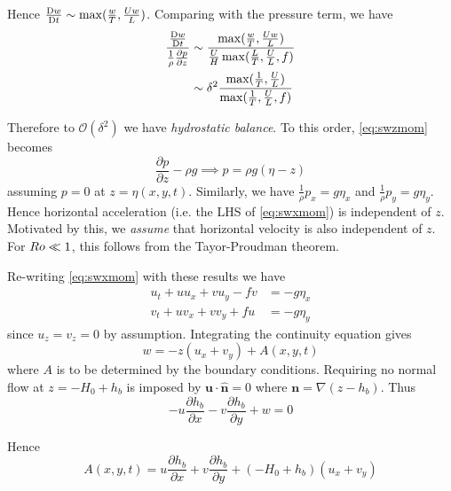 \documentclass{jknotes}
\begin{document}
Hence $\frac{\mathrm{D} w}{\mathrm{D} t} \sim \max(\frac{w}{T}, \frac{Uw}{L})$. Comparing with the
pressure term, we have
\begin{align}
	\frac{\frac{\mathrm{D} w}{\mathrm{D} t}}{\frac{1}{\rho}\frac{\partial p}{\partial
		z}} &\sim \frac{\max(\frac{w}{T},
		\frac{Uw}{L})}{\frac{U}{H}\max(\frac{L}{T}, \frac{U}{L}, f)}\\
		&\sim \delta^2
		\frac{\max(\frac{1}{T},\frac{U}{L})}{\max(\frac{1}{T},\frac{U}{L},f)}
\end{align}

Therefore to $\mathcal{O}(\delta^2)$ we have \emph{hydrostatic balance}. To
this order, \eqref{eq:swzmom} becomes
\begin{equation}
	\frac{\partial p}{\partial z} - \rho g \implies p = \rho g (\eta - z)
\end{equation}
assuming $p = 0$ at $z = \eta(x,y,t)$. Similarly, we have $\frac{1}{\rho} p_x
= g \eta_x$ and $\frac{1}{\rho} p_y = g \eta_y$. Hence horizontal acceleration
(i.e. the LHS of \eqref{eq:swxmom}) is independent of $z$. Motivated by this,
we \emph{assume} that horizontal velocity is also independent of $z$. For $Ro
\ll 1$, this follows from the Tayor-Proudman theorem.

Re-writing \eqref{eq:swxmom} with these results we have
\begin{align}
	u_t + u u_x + v u_y -fv &= -g \eta_x \label{eq:swx}\\
	v_t + u v_x + v v_y + fu &= -g \eta_y \label{eq:swy}
\end{align}
since $u_z = v_z = 0$ by assumption. Integrating the continuity equation gives
\begin{equation}
	w = -z(u_x + v_y) + A(x,y,t)
\end{equation}
where $A$ is to be determined by the boundary conditions. Requiring no normal
flow at $z = -H_0 + h_b$ is imposed by $\symbf{u}\cdot\hat{\symbf{n}} = 0$ where
$\symbf{n} = \nabla(z-h_b)$. Thus
\begin{equation}
	-u\frac{\partial h_b}{\partial x} -v \frac{\partial h_b}{\partial y} + w = 0
\end{equation}

Hence
\begin{equation}
	A(x,y,t) = u \frac{\partial h_b}{\partial x} + v \frac{\partial
	h_b}{\partial y} + (-H_0 + h_b) (u_x+v_y)
\end{equation}
\end{document}
